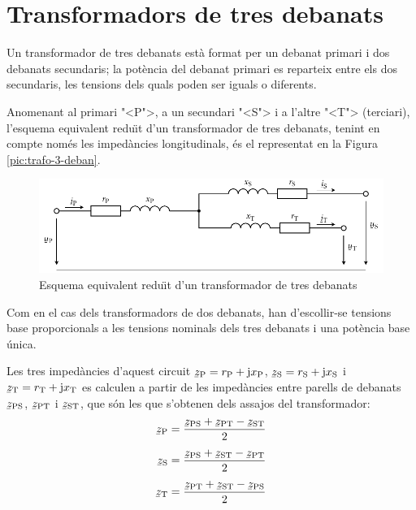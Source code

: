 \section{Transformadors de tres debanats}

Un transformador de tres debanats est\`{a} format per un debanat primari i dos debanats secundaris; la pot\`{e}ncia del debanat primari es reparteix entre els dos secundaris, les tensions dels quals poden ser iguals o diferents.

Anomenant al primari {"<}P{">}, a un secundari {"<}S{">} i a l'altre {"<}T{">} (terciari), l'esquema equivalent redu\"{\i}t d'un transformador de tres debanats, tenint en compte nom\'{e}s les imped\`{a}ncies longitudinals,  \'{e}s el representat en la Figura \vref{pic:trafo-3-deban}.

\begin{figure}[htb]
\centering
    \includegraphics{Imatges/Cap-TrafosPot-3-debanats.pdf}
\caption{Esquema equivalent redu\"{\i}t d'un transformador de tres debanats}
\label{pic:trafo-3-deban}
\end{figure}

Com en el cas dels transformadors de dos debanats, han d'escollir-se tensions base proporcionals a les tensions nominals dels tres debanats i una pot\`{e}ncia base \'{u}nica.

Les tres imped\`{a}ncies d'aquest circuit $\cmplx{z}\ped{P} = r\ped{P} + \ju x\ped{P}$, $\cmplx{z}\ped{S} = r\ped{S} + \ju x\ped{S}$ i $\cmplx{z}\ped{T} = r\ped{T} + \ju x\ped{T}$ es calculen a partir de les imped\`{a}ncies entre parells de debanats $\cmplx{z}\ped{PS}$, $\cmplx{z}\ped{PT}$ i $\cmplx{z}\ped{ST}$, que s\'{o}n les que s'obtenen dels assajos del transformador:
\begin{subequations}
\begin{align}
    \cmplx{z}\ped{P} &= \frac{\cmplx{z}\ped{PS}+\cmplx{z}\ped{PT}-\cmplx{z}\ped{ST}}{2}  \\[1ex]
    \cmplx{z}\ped{S} &= \frac{\cmplx{z}\ped{PS}+\cmplx{z}\ped{ST}-\cmplx{z}\ped{PT}}{2}  \\[1ex]
    \cmplx{z}\ped{T} &= \frac{\cmplx{z}\ped{PT}+\cmplx{z}\ped{ST}-\cmplx{z}\ped{PS}}{2}
\end{align}
\end{subequations}

